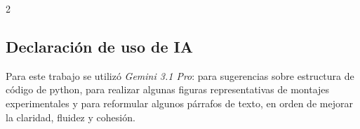 \documentclass[11pt, letterpaper]{article}
\renewcommand{\bibfont}{\normalfont\normalsize} %
\begin{document}
\begin{multicols*}{2}
\subsection*{Declaración de uso de IA}

Para este trabajo se utilizó \textit{Gemini 3.1 Pro}: para sugerencias sobre estructura de código de python, para realizar algunas figuras representativas de montajes experimentales y para reformular algunos párrafos de texto, en orden de mejorar la claridad, fluidez y cohesión.


\begingroup
    \raggedright  %
    \renewcommand{\bibfont}{\small}
    \printbibliography
\endgroup

\end{multicols*}
\end{document}
